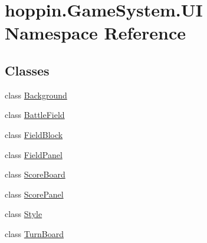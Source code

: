 \hypertarget{namespacehoppin_1_1_game_system_1_1_u_i}{}\section{hoppin.\+Game\+System.\+UI Namespace Reference}
\label{namespacehoppin_1_1_game_system_1_1_u_i}
\subsection*{Classes}
\begin{DoxyCompactItemize}
\item 
class \hyperlink{classhoppin_1_1_game_system_1_1_u_i_1_1_background}{Background}
\item 
class \hyperlink{classhoppin_1_1_game_system_1_1_u_i_1_1_battle_field}{Battle\+Field}
\item 
class \hyperlink{classhoppin_1_1_game_system_1_1_u_i_1_1_field_block}{Field\+Block}
\item 
class \hyperlink{classhoppin_1_1_game_system_1_1_u_i_1_1_field_panel}{Field\+Panel}
\item 
class \hyperlink{classhoppin_1_1_game_system_1_1_u_i_1_1_score_board}{Score\+Board}
\item 
class \hyperlink{classhoppin_1_1_game_system_1_1_u_i_1_1_score_panel}{Score\+Panel}
\item 
class \hyperlink{classhoppin_1_1_game_system_1_1_u_i_1_1_style}{Style}
\item 
class \hyperlink{classhoppin_1_1_game_system_1_1_u_i_1_1_turn_board}{Turn\+Board}
\end{DoxyCompactItemize}
